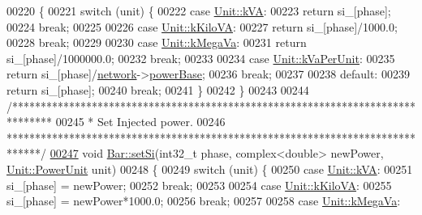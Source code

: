 \begin{DoxyCode}
00220 \{
00221   \textcolor{keywordflow}{switch} (unit) \{
00222   \textcolor{keywordflow}{case} \hyperlink{class_unit_ace265ae255370ccacfd5370337572c3ba72b181a842ae2759488a2fa1410d3696}{Unit::kVA}:
00223     \textcolor{keywordflow}{return} si\_[phase];
00224     \textcolor{keywordflow}{break};
00225 
00226   \textcolor{keywordflow}{case} \hyperlink{class_unit_ace265ae255370ccacfd5370337572c3bac9e5154522fbb810d7aed75c3ff47cb2}{Unit::kKiloVA}:
00227     \textcolor{keywordflow}{return} si\_[phase]/1000.0;
00228     \textcolor{keywordflow}{break};
00229 
00230   \textcolor{keywordflow}{case} \hyperlink{class_unit_ace265ae255370ccacfd5370337572c3ba6039da0ed20f8bee64305bab8bdec365}{Unit::kMegaVa}:
00231     \textcolor{keywordflow}{return} si\_[phase]/1000000.0;
00232     \textcolor{keywordflow}{break};
00233 
00234   \textcolor{keywordflow}{case} \hyperlink{class_unit_ace265ae255370ccacfd5370337572c3bae056e80d620a87c61a44c359e6b05cc1}{Unit::kVaPerUnit}:
00235     \textcolor{keywordflow}{return} si\_[phase]/\hyperlink{class_bar_a80025f13884750add58cc61b318357ff}{network}->\hyperlink{group___graphics_ga74bb7aa495d422f1f092acdf958df989}{powerBase};
00236     \textcolor{keywordflow}{break};
00237 
00238   \textcolor{keywordflow}{default}:
00239     \textcolor{keywordflow}{return} si\_[phase];
00240     \textcolor{keywordflow}{break};
00241   \}
00242 \}
00243 
00244 \textcolor{comment}{/*******************************************************************************}
00245 \textcolor{comment}{ * Set Injected power.}
00246 \textcolor{comment}{ ******************************************************************************/}
\hypertarget{bar_8cpp_source_l00247}{}\hyperlink{group___models_ga74e510be49e50e4c14550b32e1dc92f9}{00247} \textcolor{keywordtype}{void} \hyperlink{group___models_ga74e510be49e50e4c14550b32e1dc92f9}{Bar::setSi}(int32\_t phase, complex<double> newPower, 
      \hyperlink{class_unit_ace265ae255370ccacfd5370337572c3b}{Unit::PowerUnit} unit)
00248 \{
00249   \textcolor{keywordflow}{switch} (unit) \{
00250   \textcolor{keywordflow}{case} \hyperlink{class_unit_ace265ae255370ccacfd5370337572c3ba72b181a842ae2759488a2fa1410d3696}{Unit::kVA}:
00251     si\_[phase] = newPower;
00252     \textcolor{keywordflow}{break};
00253 
00254   \textcolor{keywordflow}{case} \hyperlink{class_unit_ace265ae255370ccacfd5370337572c3bac9e5154522fbb810d7aed75c3ff47cb2}{Unit::kKiloVA}:
00255     si\_[phase] = newPower*1000.0;
00256     \textcolor{keywordflow}{break};
00257 
00258   \textcolor{keywordflow}{case} \hyperlink{class_unit_ace265ae255370ccacfd5370337572c3ba6039da0ed20f8bee64305bab8bdec365}{Unit::kMegaVa}:

\end{DoxyCode}
